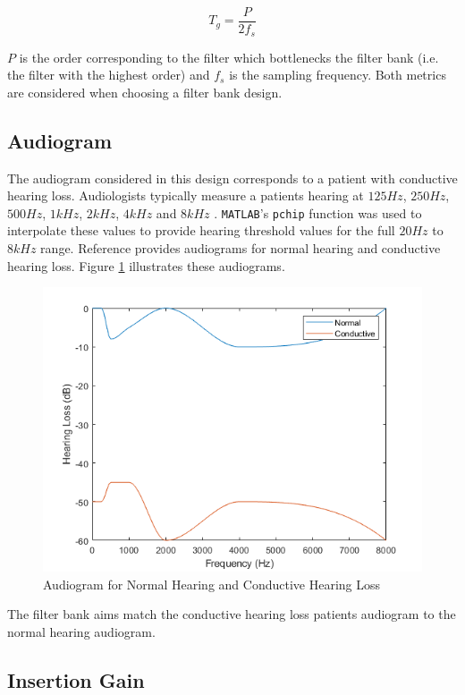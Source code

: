 \documentclass[11pt,onecolumn]{witseiepaper}
\begin{document}
\begin{equation}
\label{eqn:grpDelay}
T_g = \frac{P}{2f_s}
\end{equation}

\noindent $P$ is the order corresponding to the filter which bottlenecks the filter bank (i.e. the filter with the highest order) and $f_s$ is the sampling frequency. Both metrics are considered when choosing a filter bank design.

\subsection{Audiogram}
\label{sec:audiogram}

\noindent The audiogram considered in this design corresponds to a patient with conductive hearing loss. Audiologists typically measure a patients hearing at $125Hz$, $250Hz$, $500Hz$, $1kHz$, $2kHz$, $4kHz$ and $8kHz$ \cite{mahmoud}. \texttt{MATLAB}'s \texttt{pchip} function was used to interpolate these values to provide hearing threshold values for the full $20Hz$ to $8kHz$ range. Reference \cite{mahmoud} provides audiograms for normal hearing and conductive hearing loss. Figure \ref{fig:normCondAudio} illustrates these audiograms.

\begin{figure}[h]
\centering
\includegraphics[width=0.6\linewidth]{normCondAudiogram.PNG}
\caption{Audiogram for Normal Hearing and Conductive Hearing Loss}
\label{fig:normCondAudio}
\end{figure}  

\noindent The filter bank aims match the conductive hearing loss patients audiogram to the normal hearing audiogram.

\subsection{Insertion Gain}
\label{sec:insertGain}
\end{document}
